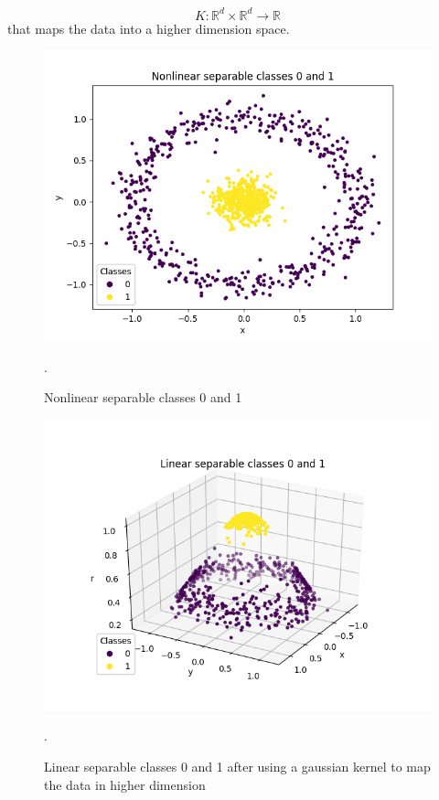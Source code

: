 \documentclass[../Main/thesis.tex]{subfiles}
\begin{document}
\begin{equation}
K: \mathbb{R}^{d}\times \mathbb{R}^{d} \rightarrow \mathbb{R}
\end{equation}
that  maps the data into a higher dimension space.
\begin{figure}[H] %
   \centering
   \includegraphics[width=6in]{../fig/nonlinearseparable.png} 
   \caption{Nonlinear separable classes 0 and 1}.
   \label{fig:kernelsvm}
\end{figure}

\begin{figure}[H] %
   \centering
   \includegraphics[width=6.5in]{../fig/linearseparable.png} 
   \caption{Linear separable classes 0 and 1 after using a gaussian kernel to map the data in higher dimension}.
   \label{fig:kernelsvm1}
\end{figure}
\end{document}
